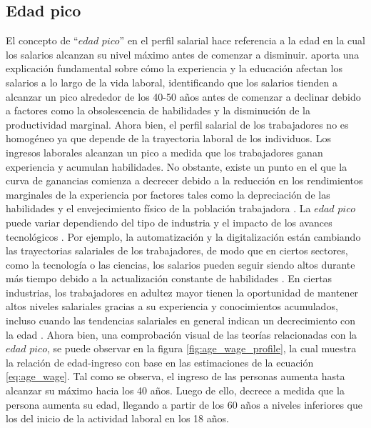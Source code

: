\documentclass[12pt,a4paper,onecolumn]{article}
\begin{document}
\subsection{Edad pico}

El concepto de ``$edad$ $pico$'' en el perfil salarial hace referencia a la edad en la cual los salarios alcanzan su nivel máximo antes de comenzar a disminuir. \cite{mincer1974} aporta una explicación fundamental sobre cómo la experiencia y la educación afectan los salarios a lo largo de la vida laboral, identificando que los salarios tienden a alcanzar un pico alrededor de los 40-50 años antes de comenzar a declinar debido a factores como la obsolescencia de habilidades y la disminución de la productividad marginal.
\bigbreak
Ahora bien, el perfil salarial de los trabajadores no es homogéneo 
 ya que depende de la trayectoria laboral de los individuos. Los ingresos laborales alcanzan un pico a medida que los trabajadores ganan experiencia y acumulan habilidades. No obstante, existe un punto en el que la curva de ganancias comienza a decrecer debido a la reducción en los rendimientos marginales de la experiencia por factores tales como la depreciación de las habilidades y el envejecimiento físico de la población trabajadora \citep{willis1986}.
\bigbreak
 La $edad$ $pico$ puede variar dependiendo del tipo de industria y el impacto de los avances tecnológicos \citep{acemoglu2018}. Por ejemplo, la automatización y la digitalización están cambiando las trayectorias salariales de los trabajadores, de modo que en ciertos sectores, como la tecnología o las ciencias, los salarios pueden seguir siendo altos durante más tiempo debido a la actualización constante de habilidades \citep{brynjolfsson2014}. En ciertas industrias, los trabajadores en adultez mayor tienen la oportunidad de mantener altos niveles salariales gracias a su experiencia y conocimientos acumulados, incluso cuando las tendencias salariales en general indican un decrecimiento con la edad \citep{autor2020}.
\bigbreak
Ahora bien, una comprobación visual de las teorías relacionadas con la $edad$ $pico$, se puede observar en la figura \ref{fig:age_wage_profile}, la cual muestra la relación de edad-ingreso con base en las estimaciones de la ecuación \ref{eq:age_wage}. Tal como se observa, el ingreso de las personas aumenta hasta alcanzar su máximo hacia los 40 años. Luego de ello, decrece a medida que la persona aumenta su edad, llegando a partir de los 60 años a niveles inferiores que los del inicio de la actividad laboral en los 18 años.
\bigbreak
\end{document}
